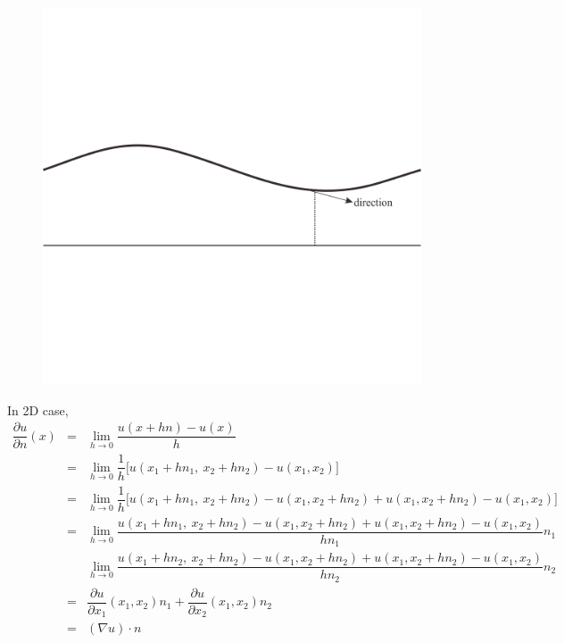 \documentclass[a4paper,10pt]{article}
\begin{document}
\begin{figure}[h!]
	\centering
	\includegraphics[width=0.5\linewidth]{picture/reasonIn1D}
	\caption{}
	\label{fig:reasonin1d}
\end{figure}

In 2D case,
\begin{eqnarray}\nonumber
\dfrac{\partial u}{\partial n}(x) &=& \lim\limits_{h \rightarrow 0} \dfrac{u(x+hn)-u(x)}{h} \\ \nonumber
&=& \lim\limits_{h \rightarrow 0} \dfrac{1}{h} \big[ u(x_{1}+hn_{1}, \ x_{2}+hn_{2}) - u(x_{1},x_{2}) \big] \\ \nonumber
&=& \lim\limits_{h \rightarrow 0} \dfrac{1}{h} \big[ u(x_{1}+hn_{1}, \ x_{2}+hn_{2}) - u(x_{1},x_{2}+hn_{2})+ u(x_{1},x_{2}+hn_{2}) - u(x_{1},x_{2})  \big] \\ \nonumber
&=& \lim\limits_{h \rightarrow 0} \dfrac{u(x_{1}+hn_{1}, \ x_{2}+hn_{2}) - u(x_{1},x_{2}+hn_{2})+ u(x_{1},x_{2}+hn_{2}) - u(x_{1},x_{2})}{hn_{1}} n_{1} \\ \nonumber
& & \lim\limits_{h \rightarrow 0} \dfrac{u(x_{1}+hn_{2}, \ x_{2}+hn_{2}) - u(x_{1},x_{2}+hn_{2})+ u(x_{1},x_{2}+hn_{2}) - u(x_{1},x_{2})}{hn_{2}} n_{2} \\ \nonumber
&=& \dfrac{\partial u}{\partial x_{1}} (x_{1},x_{2}) n_{1} + \dfrac{\partial u}{\partial x_{2}} (x_{1},x_{2})n_{2} \\ \nonumber
&=& (\nabla u) \cdot n
\end{eqnarray}
\end{document}
